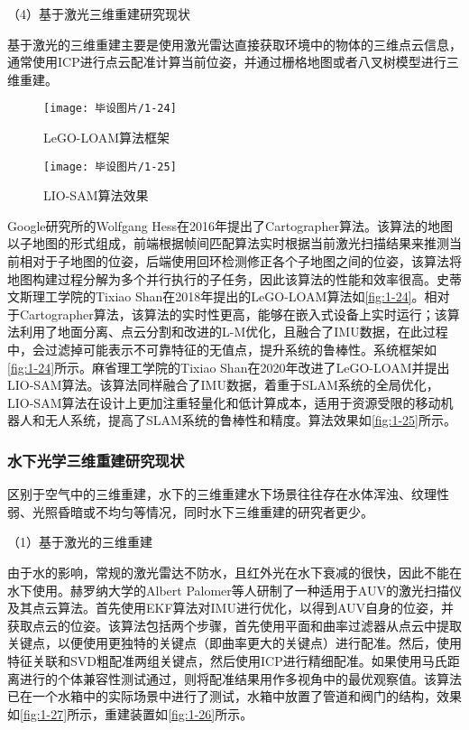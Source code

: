（4）基于激光三维重建研究现状

基于激光的三维重建主要是使用激光雷达直接获取环境中的物体的三维点云信息，通常使用ICP进行点云配准计算当前位姿，并通过栅格地图或者八叉树模型进行三维重建。

\begin{figure}[htbp]
    \centering
    \texttt{[image: 毕设图片/1-24]}
    \caption{\label{fig:1-24}LeGO-LOAM算法框架\cite{LeGO-LOAM}}
\end{figure}

\begin{figure}[htbp]
    \centering
    \texttt{[image: 毕设图片/1-25]}
    \caption{\label{fig:1-25}LIO-SAM算法效果\cite{LIO-SAM}}
\end{figure}

Google研究所的Wolfgang Hess在2016年提出了Cartographer\cite{Cartographer}算法。该算法的地图以子地图的形式组成，前端根据帧间匹配算法实时根据当前激光扫描结果来推测当前相对于子地图的位姿，后端使用回环检测修正各个子地图之间的位姿，该算法将地图构建过程分解为多个并行执行的子任务，因此该算法的性能和效率很高。史蒂文斯理工学院的Tixiao Shan在2018年提出的LeGO-LOAM\cite{LeGO-LOAM}算法如\autoref{fig:1-24}。相对于Cartographer算法，该算法的实时性更高，能够在嵌入式设备上实时运行；该算法利用了地面分离、点云分割和改进的L-M优化，且融合了IMU数据，在此过程中，会过滤掉可能表示不可靠特征的无值点，提升系统的鲁棒性。系统框架如\autoref{fig:1-24}所示。麻省理工学院的Tixiao Shan在2020年改进了LeGO-LOAM并提出LIO-SAM\cite{LIO-SAM}算法。该算法同样融合了IMU数据，着重于SLAM系统的全局优化，LIO-SAM算法在设计上更加注重轻量化和低计算成本，适用于资源受限的移动机器人和无人系统，提高了SLAM系统的鲁棒性和精度。算法效果如\autoref{fig:1-25}所示。

\subsubsection{水下光学三维重建研究现状}

区别于空气中的三维重建，水下的三维重建水下场景往往存在水体浑浊、纹理性弱、光照昏暗或不均匀等情况，同时水下三维重建的研究者更少。

（1）基于激光的三维重建

由于水的影响，常规的激光雷达不防水，且红外光在水下衰减的很快，因此不能在水下使用。赫罗纳大学的Albert Palomer\cite{PALOMER}等人研制了一种适用于AUV的激光扫描仪及其点云算法。首先使用EKF算法对IMU进行优化，以得到AUV自身的位姿，并获取点云的位姿。该算法包括两个步骤，首先使用平面和曲率过滤器从点云中提取关键点，以便使用更独特的关键点（即曲率更大的关键点）进行配准。然后，使用特征关联和SVD粗配准两组关键点，然后使用ICP进行精细配准。如果使用马氏距离进行的个体兼容性测试通过，则将配准结果用作多视角中的最优观察值。该算法已在一个水箱中的实际场景中进行了测试，水箱中放置了管道和阀门的结构，效果如\autoref{fig:1-27}所示，重建装置如\autoref{fig:1-26}所示。


